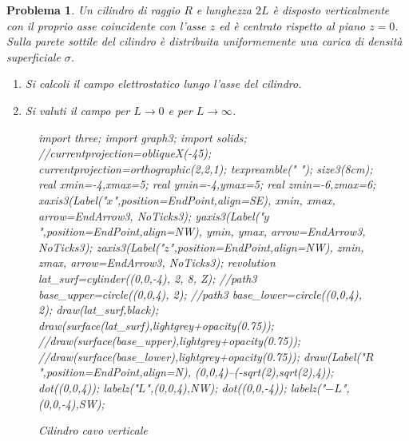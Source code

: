 \documentclass[a4paper,oneside]{article}
\newtheorem{problema}{Problema}
\let\oldhat\hat
\renewcommand{\vec}[1]{\mathbf{#1}}
\renewcommand{\hat}[1]{\widehat{\mathbf{#1}}}
\begin{document}
\begin{problema}
	Un cilindro di raggio $R$ e lunghezza $2L$ è disposto verticalmente 
	con il proprio asse coincidente con l'asse $z$ ed è centrato 
	rispetto al piano $z=0$. Sulla parete sottile del cilindro è distribuita
	uniformemente una carica di densità superficiale $\sigma$.
	\begin{enumerate}
		\item Si calcoli il campo elettrostatico lungo l'asse del cilindro.
		\item Si valuti il campo per $L \longrightarrow 0$ e per 
		$L \longrightarrow \infty$.
	\end{enumerate}
	\begin{figure}%
			\centering
			\begin{asy}[height=6cm,inline=true,attach=false,viewportwidth=\linewidth]
				import three;
				import graph3;
				import solids;
				//currentprojection=obliqueX(-45);
				currentprojection=orthographic(2,2,1);
				texpreamble("\let\oldhat\hat
				\renewcommand{\vec}[1]{\mathbf{#1}}
				\renewcommand{\hat}[1]{\oldhat{\mathbf{#1}}}");
				size3(8cm);
				real xmin=-4,xmax=5;
				real ymin=-4,ymax=5;
				real zmin=-6,zmax=6;
				xaxis3(Label("\small $x$",position=EndPoint,align=SE),
				xmin, xmax, arrow=EndArrow3, NoTicks3);
				yaxis3(Label("\small $y$",position=EndPoint,align=NW),
				ymin, ymax, arrow=EndArrow3, NoTicks3);
				zaxis3(Label("\small $z$",position=EndPoint,align=NW),
				zmin, zmax, arrow=EndArrow3, NoTicks3);
				revolution lat_surf=cylinder((0,0,-4), 2, 8, Z);
				//path3 base_upper=circle((0,0,4), 2);
				//path3 base_lower=circle((0,0,4), 2);
				draw(lat_surf,black);
				draw(surface(lat_surf),lightgrey+opacity(0.75));
				//draw(surface(base_upper),lightgrey+opacity(0.75));
				//draw(surface(base_lower),lightgrey+opacity(0.75));
				draw(Label("$R$",position=EndPoint,align=N),
				(0,0,4)--(-sqrt(2),sqrt(2),4));
				dot((0,0,4));
				labelz("$L$",(0,0,4),NW);
				dot((0,0,-4));
				labelz("$-L$",(0,0,-4),SW);
			\end{asy}
			\caption{Cilindro cavo verticale}
			\label{fig:cilindro_cavo}
		\end{figure}	
\end{problema}
\end{document}
